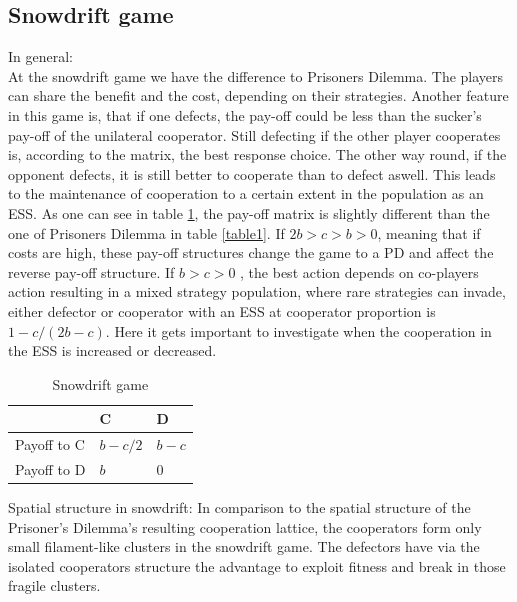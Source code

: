 \documentclass[DIV=calc, paper=a4, fontsize=11pt, twocolumn]{scrartcl}	 %
\begin{document}
\subsection*{Snowdrift game}

In general: \\
At the snowdrift game we have the difference to Prisoners Dilemma. The players can share the benefit and the cost, depending on their strategies. Another feature in this game is, that if one defects, the pay-off could be less than the sucker's pay-off of the unilateral cooperator. Still defecting if the other player cooperates is, according to the matrix, the best response choice. The other way round, if the opponent defects, it is still better to cooperate than to defect aswell. This leads to the maintenance of cooperation to a certain extent in the population as an ESS. As one can see in table \ref{table2}, the pay-off matrix is slightly different than the one of Prisoners Dilemma in table \ref{table1}. 
If $2b > c > b > 0$, meaning that if costs are high, these pay-off structures change the game to a PD and affect the reverse pay-off structure. If $b > c > 0$ , the best action depends on co-players action resulting in a mixed strategy population, where rare strategies can invade, either defector or cooperator with an ESS at cooperator proportion is $1- c/(2b-c)$. Here it gets important to investigate when the cooperation in the ESS is increased or decreased.


\begin{table}[h]
\caption{Snowdrift game}
\label{table2}
\centering
\begin{tabular}{lll}
 & C & D \\
\midrule
Payoff to C & $b-c/2$ & $b-c$ \\
Payoff to D & $b$ & $0$ \\
\bottomrule
\end{tabular}
\end{table}

Spatial structure in snowdrift: 
In comparison to the spatial structure  of the Prisoner's Dilemma's resulting cooperation lattice, the cooperators form only small filament-like clusters in the snowdrift game. The defectors have via the isolated cooperators structure the advantage to exploit fitness and break in those fragile clusters.
\end{document}
